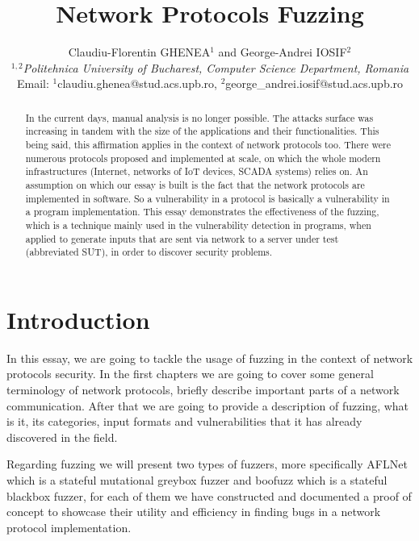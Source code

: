 \documentclass[10pt,a4paper,english,onecolumn]{IEEEtran}
\begin{document}
\title{Network Protocols Fuzzing}

\author{Claudiu-Florentin GHENEA$^{1}$ and George-Andrei IOSIF$^{2}$\\
$^{1,2}$\emph{Politehnica University of Bucharest, Computer Science Department, Romania}\\
Email: $^{1}$claudiu.ghenea@stud.acs.upb.ro, $^{2}$george\_andrei.iosif@stud.acs.upb.ro}

\maketitle

\begin{abstract}

In the current days, manual analysis is no longer possible. The attacks surface was increasing in tandem with the size of the applications and their functionalities. This being said, this affirmation applies in the context of network protocols too. There were numerous protocols proposed and implemented at scale, on which the whole modern infrastructures (Internet, networks of IoT devices, SCADA systems) relies on. An assumption on which our essay is built is the fact that the network protocols are implemented in software. So a vulnerability in a protocol is basically a vulnerability in a program implementation. This essay demonstrates the effectiveness of the fuzzing, which is a technique mainly used in the vulnerability detection in programs, when applied to generate inputs that are sent via network to a server under test (abbreviated SUT), in order to discover security problems.

\end{abstract}

\section{Introduction}

In this essay, we are going to tackle the usage of fuzzing in the context of network protocols security. In the first chapters we are going to cover some general terminology of network protocols, briefly describe important parts of a network communication. After that we are going to provide a description of fuzzing, what is it, its categories, input formats and vulnerabilities that it has already discovered in the field.

Regarding fuzzing we will present two types of fuzzers, more specifically AFLNet which is a stateful mutational greybox fuzzer and boofuzz which is a stateful blackbox fuzzer, for each of them we have constructed and documented a proof of concept to showcase their utility and efficiency in finding bugs in a network protocol implementation.
\end{document}
